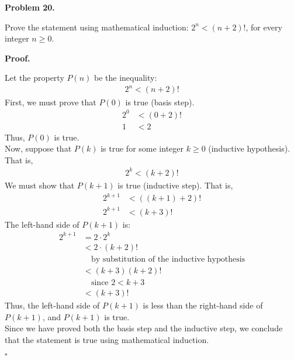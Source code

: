 \documentclass{article}
\newenvironment{problem}[1]{
    \begin{mdframed}[backgroundcolor=gray!20, skipabove=\baselineskip, skipbelow=\baselineskip, nobreak=true, innerleftmargin=10pt, innerrightmargin=10pt, innertopmargin=10pt, innerbottommargin=10pt]
    \textbf{Problem #1.}
}{
    \end{mdframed}
}
\newenvironment{proof}{
    \begin{mdframed}[nobreak=false, innerleftmargin=10pt, innerrightmargin=10pt, innertopmargin=10pt, innerbottommargin=10pt]
    \textbf{Proof.}
}{
    \hfill $\square$
    \end{mdframed}
}
\begin{document}
    \begin{problem}{20}
        Prove the statement using mathematical induction: $2^n < (n+2)!$, for every integer $n \geq 0$.
    \end{problem}
    \begin{proof}
        Let the property $P(n)$ be the inequality:
        \begin{align*}
            2^n < (n+2)!
        \end{align*}
        First, we must prove that $P(0)$ is true (basis step).
        \begin{align*}
            2^0 &< (0+2)! \\
            1 &< 2
        \end{align*}
        Thus, $P(0)$ is true. \\
        Now, suppose that $P(k)$ is true for some integer $k \geq 0$ (inductive hypothesis). That is,
        \begin{align*}
            2^k < (k+2)!
        \end{align*}
        We must show that $P(k+1)$ is true (inductive step). That is,
        \begin{align*}
            2^{k+1} &< ((k+1)+2)! \\
            2^{k+1} &< (k+3)!
        \end{align*}
        The left-hand side of $P(k+1)$ is:
        \begin{align*}
            2^{k+1} &= 2 \cdot 2^k \\
            &< 2 \cdot (k+2)! \\
            & \quad \text{by substitution of the inductive hypothesis} \\
            &< (k+3)(k+2)! \\
            & \quad \text{since $2 < k+3$} \\
            &< (k+3)!
        \end{align*}
        Thus, the left-hand side of $P(k+1)$ is less than the right-hand side of $P(k+1)$, and $P(k+1)$ is true. \\
        Since we have proved both the basis step and the inductive step, we conclude that the statement is true using mathematical induction.
    \end{proof}
\end{document}
